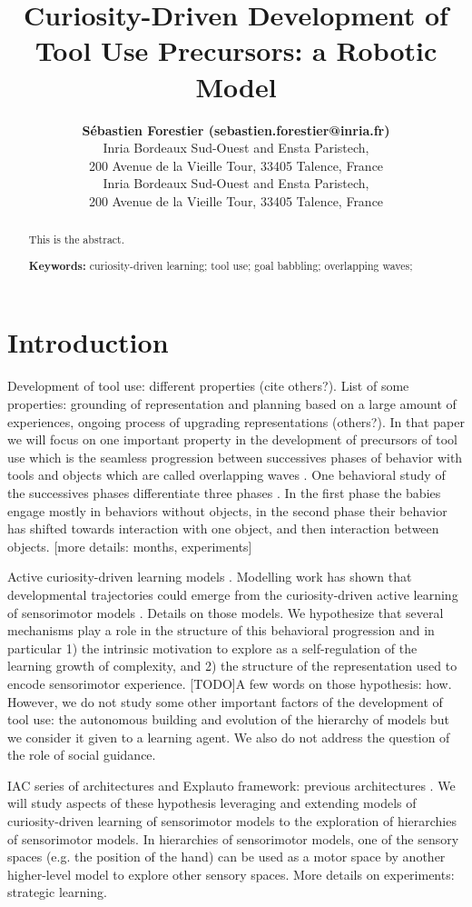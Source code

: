 \documentclass[10pt,letterpaper]{article}
\title{Curiosity-Driven Development of Tool Use Precursors: a Robotic Model}
\author{{\large \bf S\'ebastien Forestier (sebastien.forestier@inria.fr)} \\
	Inria Bordeaux Sud-Ouest and Ensta Paristech,\\
	200 Avenue de la Vieille Tour, 33405 Talence, France
  \AND {\large \bf Pierre-Yves Oudeyer (pierre-yves.oudeyer@inria.fr)} \\
	Inria Bordeaux Sud-Ouest and Ensta Paristech,\\
	200 Avenue de la Vieille Tour, 33405 Talence, France}
\begin{document}
\maketitle


\begin{abstract}
This is the abstract.

\textbf{Keywords:} 
curiosity-driven learning; tool use; goal babbling; overlapping waves; 
\end{abstract}


\section{Introduction}

	Development of tool use: different properties \cite{guerin2013survey} (cite others?). 
	List of some properties: grounding of representation and planning based on a large amount of experiences, ongoing process of upgrading representations (others?).
	In that paper we will focus on one important property in the development of precursors of tool use which is the seamless progression 
	between successives phases of behavior with tools and objects which are called overlapping waves \cite{siegler1996emerging}. 
	One behavioral study of the successives phases differentiate three phases \cite{guerin2013survey}.
	In the first phase the babies engage mostly in behaviors without objects, in the second phase their behavior has shifted towards interaction with one object, and then interaction between objects.
	[more details: months, experiments]
	
	Active curiosity-driven learning models	\cite{santucci2013}.
	Modelling work has shown that developmental trajectories could emerge from the curiosity-driven active learning of sensorimotor models \cite{oudeyer_what_2007} \cite{moulin-frier_self-organization_2014}.
	Details on those models.
	We hypothesize that several mechanisms play a role in the structure of this behavioral progression and in particular 
	1) the intrinsic motivation to explore as a self-regulation of the learning growth of complexity, and 
	2) the structure of the representation used to encode sensorimotor experience.	
	[TODO]A few words on those hypothesis: how.
	However, we do not study some other important factors of the development of tool use: the autonomous building and evolution of the hierarchy of models but we consider it given to a learning agent.
	We also do not address the question of the role of social guidance.
	
	IAC series of architectures and Explauto framework: previous architectures \cite{baranes_active_2013}.
	We will study aspects of these hypothesis leveraging and extending models of curiosity-driven learning of sensorimotor models to the exploration of hierarchies of sensorimotor models.
	In hierarchies of sensorimotor models, one of the sensory spaces (e.g. the position of the hand) can be used as a motor space by another higher-level model to explore other sensory spaces.
	More details on experiments: strategic learning.
	
\end{document}
